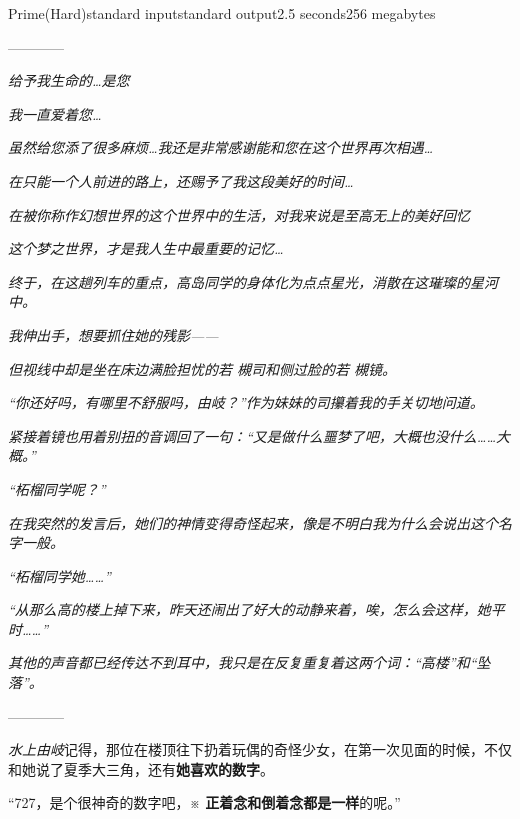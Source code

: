 \documentclass[12pt,a4paper,oneside]{article}
\begin{document}
	
	\begin{problem}{Prime(Hard)}{standard input}{standard output}{2.5 seconds}{256 megabytes}

        ------------
        
        \textit{给予我生命的…是您}
        
        \textit{我一直爱着您…}
        
        \textit{虽然给您添了很多麻烦…我还是非常感谢能和您在这个世界再次相遇…}
        
    	\textit{在只能一个人前进的路上，还赐予了我这段美好的时间…}
    	
        \textit{在被你称作幻想世界的这个世界中的生活，对我来说是至高无上的美好回忆}
    	
        \textit{这个梦之世界，才是我人生中最重要的记忆…}
        
        \textit{终于，在这趟列车的重点，高岛同学的身体化为点点星光，消散在这璀璨的星河中。}
        
        \textit{我伸出手，想要抓住她的残影——}
        
        \textit{但视线中却是坐在床边满脸担忧的若{ 槻}司和侧过脸的若{ 槻}镜。}
        
        \textit{“你还好吗，有哪里不舒服吗，由岐？”作为妹妹的司攥着我的手关切地问道。}
        
        \textit{紧接着镜也用着别扭的音调回了一句：“又是做什么噩梦了吧，大概也没什么……大概。”}
        
        \textit{“柘榴同学呢？”}
        
        \textit{在我突然的发言后，她们的神情变得奇怪起来，像是不明白我为什么会说出这个名字一般。}
        
        \textit{“柘榴同学她……”}
        
        \textit{“从那么高的楼上掉下来，昨天还闹出了好大的动静来着，唉，怎么会这样，她平时……”}
        
        \textit{其他的声音都已经传达不到耳中，我只是在反复重复着这两个词：“高楼”和“坠落”。}

        ------------
        
        \textit{水上由岐}记得，那位在楼顶往下扔着玩偶的奇怪少女，在第一次见面的时候，不仅和她说了夏季大三角，还有\textbf{她喜欢的数字}。
        
        “727，是个很神奇的数字吧，※ \textbf{正着念和倒着念都是一样}的呢。”
        

\end{problem}
\end{document}
